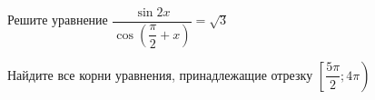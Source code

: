 \begin{ex}
	\begin{condition}
		\begin{enumcols}[label=\asbuk*)]
			\item Решите уравнение \( \dfrac{\sin 2x}{\cos (\dfrac{\pi}{2} + x)} = \sqrt{3} \)
			\item Найдите все корни уравнения, принадлежащие отрезку \( \left[\dfrac{5\pi}{2};4\pi\right) \)
		\end{enumcols}
	\end{condition}
\end{ex}